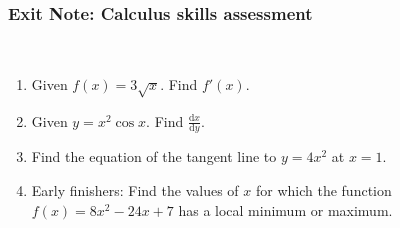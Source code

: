 \documentclass[12pt, twoside]{article}
\begin{document}
\newpage
\setcounter{page}{1}
\subsubsection*{Exit Note: Calculus skills assessment}\\

\begin{enumerate}
  \item Given $f(x)= 3\sqrt{x}$. Find $f'(x)$. \vspace{4cm}
  \item Given $y= x^2\cos{x}$. Find $\displaystyle \frac{\text{d}x}{\text{d}y}$. \vspace{5cm}
  \item Find the equation of the tangent line to $y=4x^2$ at $x=1$. \vspace{5cm}
  \item Early finishers: Find the values of $x$ for which the function $f(x) = 8x^2-24x+7$ has a local minimum or maximum.


\end{enumerate}
\end{document}
